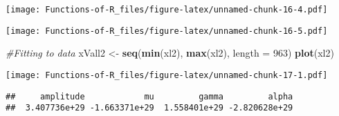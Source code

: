 \documentclass[
]{article}
\newenvironment{Shaded}{\begin{snugshade}}{\end{snugshade}}
\newcommand{\AttributeTok}[1]{\textcolor[rgb]{0.13,0.29,0.53}{#1}}
\newcommand{\CommentTok}[1]{\textcolor[rgb]{0.56,0.35,0.01}{\textit{#1}}}
\newcommand{\DecValTok}[1]{\textcolor[rgb]{0.00,0.00,0.81}{#1}}
\newcommand{\FloatTok}[1]{\textcolor[rgb]{0.00,0.00,0.81}{#1}}
\newcommand{\FunctionTok}[1]{\textcolor[rgb]{0.13,0.29,0.53}{\textbf{#1}}}
\newcommand{\NormalTok}[1]{#1}
\newcommand{\OtherTok}[1]{\textcolor[rgb]{0.56,0.35,0.01}{#1}}
\newcommand{\SpecialCharTok}[1]{\textcolor[rgb]{0.81,0.36,0.00}{\textbf{#1}}}
\newcommand{\StringTok}[1]{\textcolor[rgb]{0.31,0.60,0.02}{#1}}
\begin{document}
\texttt{[image: Functions-of-R\_files/figure-latex/unnamed-chunk-16-4.pdf]}

\begin{Shaded}
\end{Shaded}

\texttt{[image: Functions-of-R\_files/figure-latex/unnamed-chunk-16-5.pdf]}

\begin{Shaded}
\begin{Highlighting}[]
\CommentTok{\#Fitting to data}
\NormalTok{xVall2 }\OtherTok{\textless{}{-}} \FunctionTok{seq}\NormalTok{(}\FunctionTok{min}\NormalTok{(xl2), }\FunctionTok{max}\NormalTok{(xl2), }\AttributeTok{length =} \DecValTok{963}\NormalTok{)}
\FunctionTok{plot}\NormalTok{(xl2)}
\end{Highlighting}
\end{Shaded}

\texttt{[image: Functions-of-R\_files/figure-latex/unnamed-chunk-17-1.pdf]}

\begin{Shaded}
\end{Shaded}

\begin{verbatim}
##     amplitude            mu         gamma         alpha 
##  3.407736e+29 -1.663371e+29  1.558401e+29 -2.820628e+29
\end{verbatim}
\end{document}
